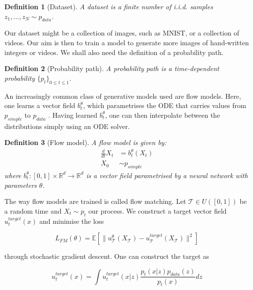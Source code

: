 \documentclass[12pt]{article}
\theoremstyle{break}
\newtheorem{definition}{Definition}[section]
\begin{document}
\begin{definition}[Dataset]
	A dataset is a finite number of i.i.d. samples $z_1,\ldots,z_N \sim p_{data}$.
\end{definition}

Our dataset might be a collection of images, such as MNIST, or a collection of videos. Our aim is then to train a model to generate more images of hand-written integers or videos. We shall also need the definition of a probability path.

\begin{definition}[Probability path]
	A probability path is a time-dependent probability $\{p_t\}_{0 \leq t \leq 1}$.
\end{definition}

An increasingly common class of generative models used are flow models. Here, one learns a vector field $b_t^{\theta}$, which parametrises the ODE that carries values from $p_{simple}$ to $p_{data}$ \cite{lipman2024}. Having learned $b_t^{\theta}$, one can then interpolate between the distributions simply using an ODE solver. 

\begin{definition}[Flow model]
	A flow model is given by:
	\begin{align*}
		\frac{d}{dt}X_t &= b_t^{\theta}(X_t) \\
		X_0 &\sim p_{simple}
	\end{align*} 
	where $b_t^{\theta}:[0,1] \times \mathbb{R}^d \to \mathbb{R}^d$ is a vector field parametrised by a neural network with parameters $\theta$.
\end{definition}

The way flow models are trained is called flow matching. Let $\mathcal{T} \in U([0,1])$ be a random time and $X_t \sim p_t$ our process. We construct a target vector field $u_t^{target}(x)$ and minimise the loss

\begin{equation*}
	L_{FM}(\theta) = \mathbb{E}[\|u_\mathcal{T}^{\theta}(X_\mathcal{T}) - u_\mathcal{T}^{target}(X_\mathcal{T})\|^2]
\end{equation*}

through stochastic gradient descent. One can construct the target as

\begin{equation*}
	u_t^{target}(x) = \int u_t^{target}(x|z)\frac{p_t(x|z)p_{data}(z)}{p_t(x)}dz
\end{equation*}
\end{document}
